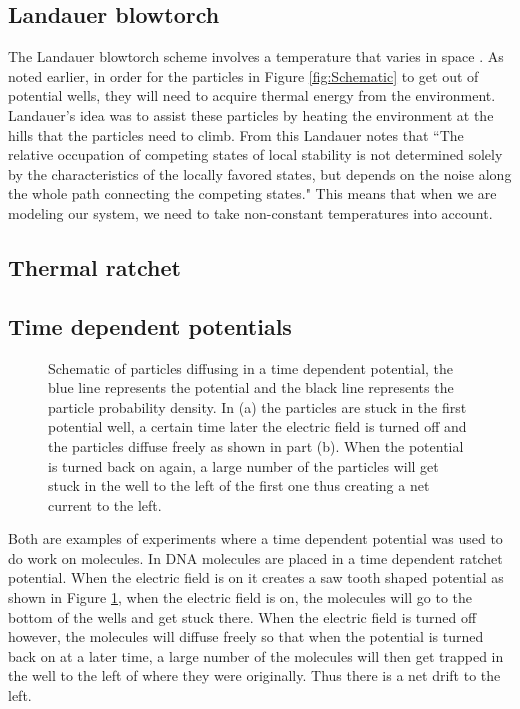 \subsection{Landauer blowtorch}
The Landauer blowtorch scheme involves a temperature that varies in space \cite{Landauer1988}. As noted earlier, in order for the particles in Figure \ref{fig:Schematic} to get out of potential wells, they will need to acquire thermal energy from the environment. Landauer's idea was to assist these particles by heating the environment at the hills that the particles need to climb. From this Landauer notes that \cite{Landauer1988} ``The relative occupation of competing states of local stability is not determined solely by the characteristics of the locally favored states, but depends on the noise along the whole path connecting the competing states." This means that when we are modeling our system, we need to take non-constant temperatures into account.

\subsection{Thermal ratchet}
\cite{Pedro2014}

\subsection{Time dependent potentials}

\begin{figure}[tb]
	\centering
\quad
\caption{Schematic of particles diffusing in a time dependent potential, the blue line represents the potential and the black line represents the particle probability density. In (a) the particles are stuck in the first potential well, a certain time later the electric field is turned off and the particles diffuse freely as shown in part (b). When the potential is turned back on again, a large number of the particles will get stuck in the well to the left of the first one thus creating a net current to the left.}
\label{fig:TimeDependent}
\end{figure}

Both \cite{BlickleBechinger2011} \cite{JoelBader1999} are examples of experiments where a time dependent potential was used to do work on molecules. In \cite{JoelBader1999} DNA molecules are placed in a time dependent ratchet potential. When the electric field is on it creates a saw tooth shaped potential as shown in Figure \ref{fig:TimeDependent}, when the electric field is on, the molecules will go to the bottom of the wells and get stuck there. When the electric field is turned off however, the molecules will diffuse freely so that when the potential is turned back on at a later time, a large number of the molecules will then get trapped in the well to the left of where they were originally. Thus there is a net drift to the left.

